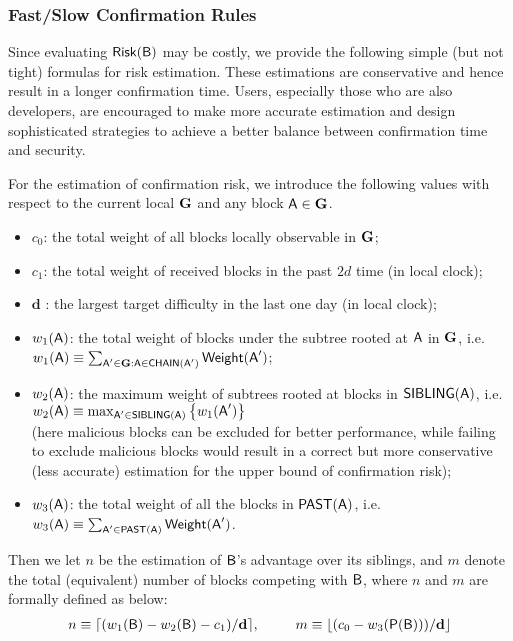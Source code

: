 \subsubsection{Fast/Slow Confirmation Rules}

Since evaluating $\mathsf{Risk}(\textsf{B})$ may be costly, 
we provide the following simple (but not tight) formulas for risk estimation. 
These estimations are conservative and hence result in a longer confirmation time. 
Users, especially those who are also developers, are encouraged to make more accurate estimation and design sophisticated strategies to achieve a better balance between confirmation time and security. 


For the estimation of confirmation risk, we introduce the following values with respect to the current local \tg $\textbf{G}$ and any block $\textsf{A}\in\textbf{G}$.

\begin{itemize}[nosep]
	\item $c_0$: the total weight of all blocks locally observable in $\textbf{G}$;
	\item $c_1$: the total weight of received blocks in the past $2d$ time (in local clock); 
	\item $\mathbf{d}$ : the largest target difficulty in the last one day (in local clock);

	\item $w_1(\textsf{A})$: the total weight of blocks under the subtree rooted at $\textsf{A}$ in $\textbf{G}$, i.e. $w_1(\textsf{A})\equiv \sum_{\textsf{A}'\in \textbf{G}: \textsf{A}\in\mathsf{CHAIN}(\textsf{A}')} \mathsf{Weight}(\textsf{A}')$;
	\item $w_2(\textsf{A})$: the maximum weight of subtrees rooted at blocks in $\mathsf{SIBLING}(\textsf{A})$, i.e. 
	$w_2(\textsf{A}) \equiv \max_{\textsf{A}'\in \mathsf{SIBLING}(\textsf{A})} {\left \{{w_1(\textsf{A}')} \right \}}$ \\
	(here malicious blocks can be excluded for better performance,
	while failing to exclude malicious blocks would result in a correct but more conservative (less accurate) estimation for the upper bound of confirmation risk);

	\item $w_3(\textsf{A})$: the total weight of all the blocks in $\mathsf{PAST}(\textsf{A})$,  i.e. $w_3(\textsf{A})\equiv \sum_{\textsf{A}'\in \mathsf{PAST}(\textsf{A})} \mathsf{Weight}(\textsf{A}')$.
\end{itemize}

 Then we let $n$ be the estimation of $\textsf{B}$'s advantage over its siblings, and $m$ denote the total (equivalent) number of blocks competing with $\textsf{B}$, 
 where $n$ and $m$ are formally defined as below:
		\begin{align}
			\label{def:nm}
			n\equiv \lceil(w_1(\textsf{B})-w_2(\textsf{B})-c_1)/\mathbf{d}\rceil,
			\;\qquad\;
			m\equiv\lfloor(c_0-w_3(\mathsf{P}{\left({\textsf{B})} \right)})/\mathbf{d}\rfloor
		\end{align}

